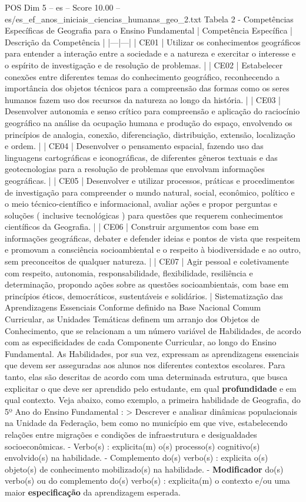 \begin{textsample}{POS Dim 5 – es – Score 10.00 – es/es\_ef\_anos\_iniciais\_ciencias\_humanas\_geo\_2.txt}
Tabela 2 - Competências Específicas de Geografia para o Ensino Fundamental | Competência Específica | Descrição da Competência | |---|---| | CE01 | Utilizar os conhecimentos geográficos para entender a interação entre a sociedade e a natureza e exercitar o interesse e o espírito de investigação e de resolução de problemas. | | CE02 | Estabelecer conexões entre diferentes temas do conhecimento geográfico, reconhecendo a importância dos objetos técnicos para a compreensão das formas como os seres humanos fazem uso dos recursos da natureza ao longo da história. | | CE03 | Desenvolver autonomia e senso crítico para compreensão e aplicação do raciocínio geográfico na análise da ocupação humana e produção do espaço, envolvendo os princípios de analogia, conexão, diferenciação, distribuição, extensão, localização e ordem. | | CE04 | Desenvolver o pensamento espacial, fazendo uso das linguagens cartográficas e iconográficas, de diferentes gêneros textuais e das geotecnologias para a resolução de problemas que envolvam informações geográficas. | | CE05 | Desenvolver e utilizar processos, práticas e procedimentos de investigação para compreender o mundo natural, social, econômico, político e o meio técnico-científico e informacional, avaliar ações e propor perguntas e soluções ( inclusive tecnológicas ) para questões que requerem conhecimentos científicos da Geografia. | | CE06 | Construir argumentos com base em informações geográficas, debater e defender ideias e pontos de vista que respeitem e promovam a consciência socioambiental e o respeito à biodiversidade e ao outro, sem preconceitos de qualquer natureza. | | CE07 | Agir pessoal e coletivamente com respeito, autonomia, responsabilidade, flexibilidade, resiliência e determinação, propondo ações sobre as questões socioambientais, com base em princípios éticos, democráticos, sustentáveis e solidários. | Sistematização das Aprendizagens Essenciais Conforme definido na Base Nacional Comum Curricular, as Unidades Temáticas definem um arranjo dos Objetos de Conhecimento, que se relacionam a um número variável de Habilidades, de acordo com as especificidades de cada Componente Curricular, ao longo do Ensino Fundamental.
As Habilidades, por sua vez, expressam as aprendizagens essenciais que devem ser asseguradas aos alunos nos diferentes contextos escolares.
Para tanto, elas são descritas de acordo com uma determinada estrutura, que busca explicitar o que deve ser aprendido pelo estudante, em qual \textbf{profundidade} e em qual contexto.
Veja abaixo, como exemplo, a primeira habilidade de Geografia, do 5º Ano do Ensino Fundamental : > Descrever e analisar dinâmicas populacionais na Unidade da Federação, bem como no município em que vive, estabelecendo relações entre migrações e condições de infraestrutura e desigualdades socioeconômicas. - Verbo(s) : explicita(m) o(s) processo(s) cognitivo(s) envolvido(s) na habilidade. - Complemento do(s) verbo(s) : explicita o(s) objeto(s) de conhecimento mobilizado(s) na habilidade. - \textbf{Modificador} do(s) verbo(s) ou do complemento do(s) verbo(s) : explicita(m) o contexto e/ou uma maior \textbf{especificação} da aprendizagem esperada.

\end{textsample}
